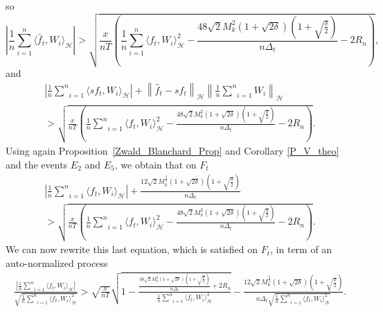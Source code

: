 \documentclass[twoside,11pt]{article}
\newcommand{\Hk}{\mathcal{H}}
\newcommand{\nb}{n}
\begin{document}
so
  $$ \left |  \frac{1}{\nb} \underset{i=1}{\overset{\nb}{\sum}} \langle \widehat{f}_t , W_i \rangle_{\Hk} \right |  
  > \sqrt{\frac{x}{\nb T} \left( \frac{1}{\nb} \underset{i=1}{\overset{\nb}{\sum}} \langle f_t , W_i \rangle_{\Hk}^2  - \frac{48 \sqrt{2} M_k^2 \left(1+ \sqrt{2\delta}\right) \left(1+ \sqrt{\frac{\delta}{2}}\right)}{\nb \Delta_t} - 2 R_{\nb} \right)}    ,
  $$
 and 
\begin{multline*}   
\left |  \frac{1}{\nb} \underset{i=1}{\overset{\nb}{\sum}} \langle s f_t , W_i \rangle_{\Hk} \right |  +  \left \| \widehat{f}_t - s f_t \right \|_{\Hk} \left \| \frac{1}{\nb} \underset{i=1}{\overset{\nb}{\sum}} W_i \right \|_{\Hk}   \\
>  \sqrt{\frac{x}{\nb T} \left( \frac{1}{\nb} \underset{i=1}{\overset{\nb}{\sum}} \langle f_t , W_i \rangle_{\Hk}^2  - \frac{48 \sqrt{2} M_k^2 \left(1+ \sqrt{2\delta}\right) \left(1+ \sqrt{\frac{\delta}{2}}\right)}{\nb \Delta_t} - 2 R_{\nb} \right)} .
\end{multline*}  
Using again Proposition~\ref{Zwald_Blanchard_Prop} and Corollary \ref{P_V_theo} and the events $E_2$ and $E_5$, we obtain that on $F_t$ 
\begin{multline*}   
  \left |  \frac{1}{\nb} \underset{i=1}{\overset{\nb}{\sum}} \langle f_t , W_i \rangle_{\Hk} \right |  +  \frac{12 \sqrt{2} M_k^{\frac{3}{2}} \left(1+ \sqrt{2\delta}\right) \left(1+ \sqrt{\frac{\delta}{2}}\right)}{\nb \Delta_t}  \\
    >    \sqrt{\frac{x}{\nb T} \left( \frac{1}{\nb} \underset{i=1}{\overset{\nb}{\sum}} \langle f_t , W_i \rangle_{\Hk}^2  - \frac{48 \sqrt{2} M_k^2 \left(1+ \sqrt{2\delta}\right) \left(1+ \sqrt{\frac{\delta}{2}}\right)}{\nb \Delta_t} - 2 R_{\nb} \right)}.
\end{multline*}  
We can now rewrite this last equation, which is satisfied on $F_t$, in term of an auto-normalized process 
\begin{multline*} 
  \frac{\left |  \frac{1}{\nb} \underset{i=1}{\overset{\nb}{\sum}} \langle f_t , W_i \rangle_{\Hk} \right |}{\sqrt{\frac{1}{\nb} \underset{i=1}{\overset{\nb}{\sum}} \langle f_t , W_i \rangle_{\Hk}^2}}  >  
 \sqrt{\frac{x}{\nb T}} \sqrt{1 - \frac{\frac{48 \sqrt{2} M_k^2 \left(1+ \sqrt{2\delta}\right) \left(1+ \sqrt{\frac{\delta}{2}}\right)}{\nb \Delta_t} + 2 R_{\nb} }{\frac{1}{\nb} \underset{i=1}{\overset{\nb}{\sum}} \langle f_t , W_i \rangle_{\Hk}^2}} -  \frac{12 \sqrt{2} M_k^{\frac{3}{2}} \left(1+ \sqrt{2\delta}\right) \left(1+ \sqrt{\frac{\delta}{2}}\right)}{\nb \Delta_t \sqrt{\frac{1}{\nb} \underset{i=1}{\overset{\nb}{\sum}} \langle f_t , W_i \rangle_{\Hk}^2}}.
\end{multline*} 
\end{document}
